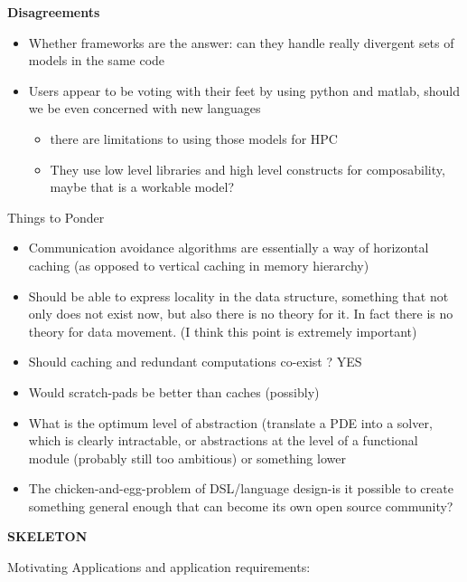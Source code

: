 \noindent
\textbf{Disagreements}
\begin{itemize}
  \item Whether frameworks are the answer: can they handle really divergent sets of models in the same code
  \item Users appear to be voting with their feet by using python and matlab, should we be even concerned with new languages
    \begin{itemize}
      \item there are limitations to using those models for HPC
      \item They use low level libraries and high level constructs for composability, maybe that is a workable model?
    \end{itemize}
\end{itemize}

\noindent
Things to Ponder
\begin{itemize}
  \item Communication avoidance algorithms are essentially a way of horizontal caching (as opposed to vertical caching in memory
  hierarchy)
  \item Should be able to express locality in the data structure, something that not only does not exist now, but also there is no theory for
  it.
    In fact there is no theory for data movement. (I think this point is extremely important)
  \item Should caching and redundant computations co-exist ? YES
  \item Would scratch-pads be better than caches (possibly)
  \item What is the optimum level of abstraction (translate a PDE into a solver, which is clearly intractable, or abstractions at the level
   of a functional module (probably still too ambitious) or something lower
  \item The chicken-and-egg-problem of DSL/language design-is it possible to create something general enough that can become its own open source
   community?
\end{itemize}

%
%
$ $\\
\noindent
{\large\textbf{SKELETON}}

Motivating Applications and application requirements:

